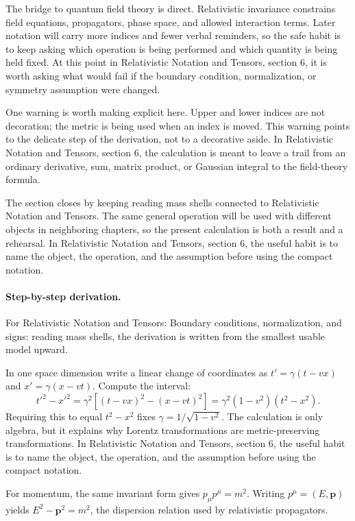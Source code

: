 The bridge to quantum field theory is direct.  Relativistic invariance constrains field equations, propagators, phase space, and allowed interaction terms.  Later notation will carry more indices and fewer verbal reminders, so the safe habit is to keep asking which operation is being performed and which quantity is being held fixed.  At this point in Relativistic Notation and Tensors, section 6, it is worth asking what would fail if the boundary condition, normalization, or symmetry assumption were changed.

One warning is worth making explicit here.  Upper and lower indices are not decoration; the metric is being used when an index is moved.  This warning points to the delicate step of the derivation, not to a decorative aside.  In Relativistic Notation and Tensors, section 6, the calculation is meant to leave a trail from an ordinary derivative, sum, matrix product, or Gaussian integral to the field-theory formula.

The section closes by keeping reading mass shells connected to Relativistic Notation and Tensors.  The same general operation will be used with different objects in neighboring chapters, so the present calculation is both a result and a rehearsal.  In Relativistic Notation and Tensors, section 6, the useful habit is to name the object, the operation, and the assumption before using the compact notation.



\paragraph{Step-by-step derivation.}

For Relativistic Notation and Tensors: Boundary conditions, normalization, and signs: reading mass shells, the derivation is written from the smallest usable model upward.

In one space dimension write a linear change of coordinates as \(t'=\gamma(t-vx)\) and \(x'=\gamma(x-vt)\).  Compute the interval:
\[
  t'^2-x'^2
  =
  \gamma^2[(t-vx)^2-(x-vt)^2]
  =
  \gamma^2(1-v^2)(t^2-x^2).
\]
Requiring this to equal \(t^2-x^2\) fixes \(\gamma=1/\sqrt{1-v^2}\).  The calculation is only algebra, but it explains why Lorentz transformations are metric-preserving transformations.  In Relativistic Notation and Tensors, section 6, the useful habit is to name the object, the operation, and the assumption before using the compact notation.

For momentum, the same invariant form gives \(p_\mu p^\mu=m^2\).  Writing \(p^\mu=(E,\bm p)\) yields \(E^2-\bm p^2=m^2\), the dispersion relation used by relativistic propagators.

